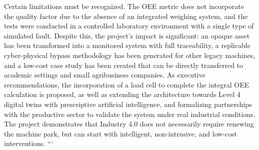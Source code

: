 Certain limitations must be recognized. The OEE metric does not incorporate the quality factor due to the absence of an integrated weighing system, and the tests were conducted in a controlled laboratory environment with a single type of simulated fault. Despite this, the project's impact is significant: an opaque asset has been transformed into a monitored system with full traceability, a replicable cyber-physical bypass methodology has been generated for other legacy machines, and a low-cost case study has been created that can be directly transferred to academic settings and small agribusiness companies. As executive recommendations, the incorporation of a load cell to complete the integral OEE calculation is proposed, as well as extending the architecture towards Level 4 digital twins with prescriptive artificial intelligence, and formalizing partnerships with the productive sector to validate the system under real industrial conditions. The project demonstrates that Industry 4.0 does not necessarily require renewing the machine park, but can start with intelligent, non-intrusive, and low-cost interventions.
```